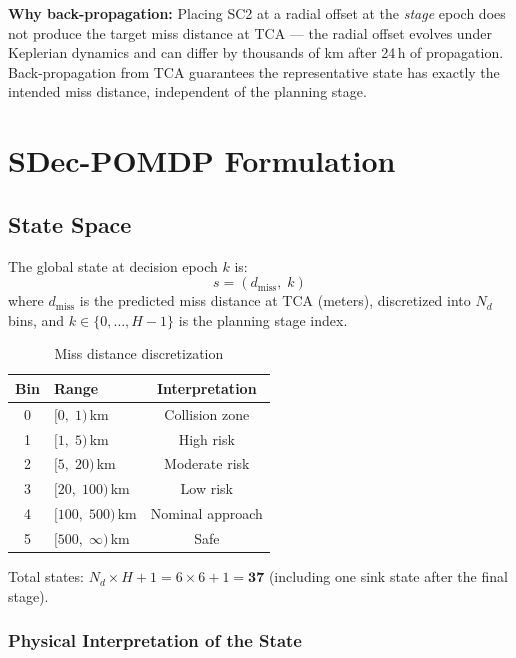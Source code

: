 \documentclass[11pt]{article}
\begin{document}
\noindent\textbf{Why back-propagation:} Placing SC2 at a radial offset at the
\emph{stage} epoch does not produce the target miss distance at TCA --- the radial
offset evolves under Keplerian dynamics and can differ by thousands of km after
24\,h of propagation. Back-propagation from TCA guarantees the representative
state has exactly the intended miss distance, independent of the planning stage.

\section{SDec-POMDP Formulation}

\subsection{State Space}

The global state at decision epoch $k$ is:
\begin{equation}
  s = (d_\text{miss},\; k)
\end{equation}
where $d_\text{miss}$ is the predicted miss distance at TCA (meters), discretized
into $N_d$ bins, and $k \in \{0, \ldots, H-1\}$ is the planning stage index.

\begin{table}[h]
\centering
\caption{Miss distance discretization}
\begin{tabular}{clc}
\toprule
Bin & Range & Interpretation \\
\midrule
0 & $[0,\; 1)$\,km   & Collision zone \\
1 & $[1,\; 5)$\,km   & High risk \\
2 & $[5,\; 20)$\,km  & Moderate risk \\
3 & $[20,\; 100)$\,km & Low risk \\
4 & $[100,\; 500)$\,km & Nominal approach \\
5 & $[500,\; \infty)$\,km & Safe \\
\bottomrule
\end{tabular}
\end{table}

\noindent Total states: $N_d \times H + 1 = 6 \times 6 + 1 = \mathbf{37}$
(including one sink state after the final stage).

\subsubsection*{Physical Interpretation of the State}
\end{document}
